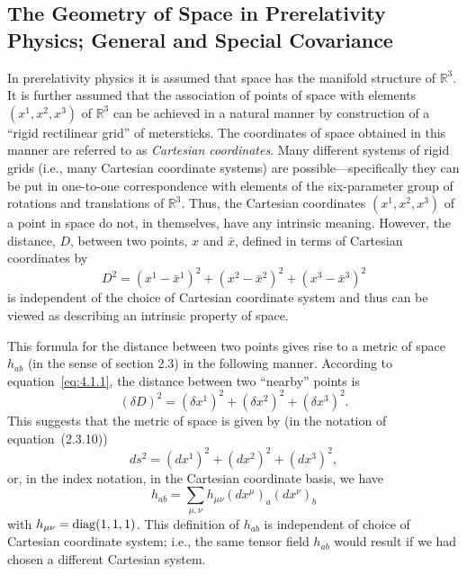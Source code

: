
\subsection{The Geometry of Space in Prerelativity Physics; General and Special
\mbox{Covariance}}\label{sec:4.1}

In prerelativity physics it is assumed that space has the manifold structure of
\(\mathbb R^3\). It is further assumed that the association of points of space
with elements \((x^1,x^2,x^3)\) of \(\mathbb R^3\) can be achieved in a
natural manner by construction of a \textquotedblleft rigid rectilinear
grid\textquotedblright{} of metersticks. The coordinates of space obtained in
this manner are referred to as \emph{Cartesian coordinates}. Many different
systems of rigid grids (i.e., many Cartesian coordinate systems) are
possible---specifically they can be put in one-to-one correspondence with
elements of the six-parameter group of rotations and translations of
\(\mathbb R^3\). Thus, the Cartesian coordinates \((x^1,x^2,x^3)\) of a
point in space do not, in themselves, have any intrinsic meaning. However, the
distance, \(D\), between two points, \(x\) and \(\bar x\), defined in terms
of Cartesian coordinates by
\begin{equation}
  D^2=(x^1-\bar x^1)^2+(x^2-\bar x^2)^2+(x^3-\bar x^3)^2
  \tag{4.1.1}\label{eq:4.1.1}
\end{equation}
is independent of the choice of Cartesian coordinate system and thus can be
viewed as describing an intrinsic property of space.

This formula for the distance between two points gives rise to a metric of space
\(h_{ab}\) (in the sense of section 2.3) in the following manner. According to
equation~\eqref{eq:4.1.1}, the distance between two
\textquotedblleft nearby\textquotedblright{} points is
\begin{equation}
  (\delta D)^2=(\delta x^1)^2+(\delta x^2)^2+(\delta x^3)^2 .
  \tag{4.1.2}\label{eq:4.1.2}
\end{equation}
This suggests that the metric of space is given by (in the notation of
equation~(2.3.10))
\begin{equation}
  ds^2=(dx^1)^2+(dx^2)^2+(dx^3)^2 ,
  \tag{4.1.3}\label{eq:4.1.3}
\end{equation}
or, in the index notation, in the Cartesian coordinate basis, we have
\begin{equation}
  h_{ab}=\sum_{\mu,\nu}h_{\mu\nu}(dx^\mu)_a(dx^\nu)_b
  \tag{4.1.4}\label{eq:4.1.4}
\end{equation}
with \(h_{\mu\nu}=\operatorname{diag}(1,1,1)\). This definition of \(h_{ab}\) is
independent of choice of Cartesian coordinate system; i.e., the same tensor field
\(h_{ab}\) would result if we had chosen a different Cartesian system.

